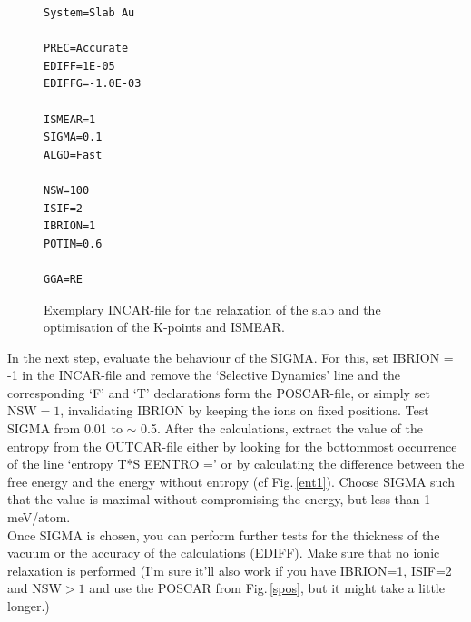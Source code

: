 \documentclass[twoside, 11pt, titlepage, captions=nooneline, a4paper, headsepline]{scrbook}%
\newcommand{\9}{\mathrm}
\newcommand{\0}{\,\mathrm}
\begin{document}
\begin{figure}[h!!]
\begin{verbatim}
System=Slab Au

PREC=Accurate
EDIFF=1E-05
EDIFFG=-1.0E-03

ISMEAR=1
SIGMA=0.1
ALGO=Fast

NSW=100
ISIF=2
IBRION=1
POTIM=0.6

GGA=RE
\end{verbatim}
\caption{Exemplary INCAR-file for the relaxation of the slab and the optimisation of the K-points and ISMEAR.}
\label{slabincar1}
\end{figure}
In the next step, evaluate the behaviour of the SIGMA. For this, set IBRION = -1 in the INCAR-file and remove the `Selective Dynamics' line and the corresponding `F' and `T' declarations form the POSCAR-file, or simply set $ \mathrm{NSW} = 1 $, invalidating IBRION by keeping the ions on fixed positions. Test SIGMA from 0.01 to $\sim$ 0.5. After the calculations, extract the value of the entropy from the OUTCAR-file either by looking for the bottommost occurrence of the line `entropy T*S    EENTRO =' or by calculating the difference between the free energy and the energy without entropy (cf Fig.\,\ref{ent1}). Choose SIGMA such that the value is maximal without compromising the energy, but less than 1\,meV/atom.\\
Once SIGMA is chosen, you can perform further tests for the thickness of the vacuum or the accuracy of the calculations (EDIFF). Make sure that no ionic relaxation is performed (I'm sure it'll also work if you have IBRION=1, ISIF=2 and $ \mathrm{NSW} > 1 $ and use the POSCAR from Fig.\,\ref{spos}, but it might take a little longer.)
\end{document}
